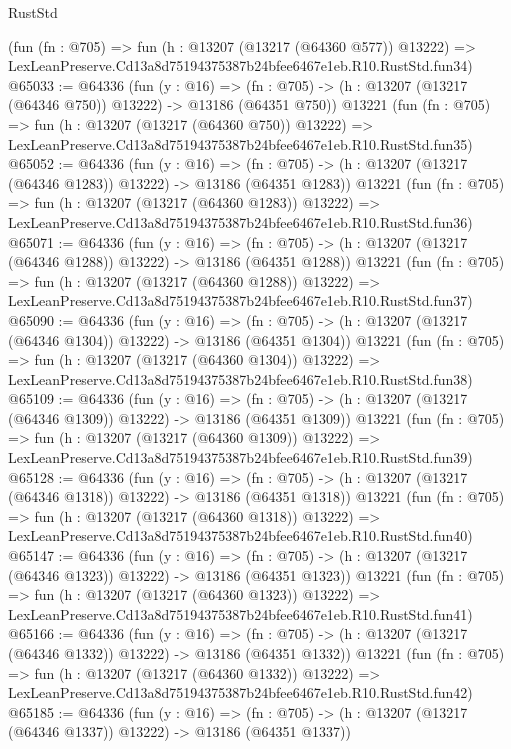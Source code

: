 \begin{lexlean}{RustStd}
\begin{coremodule}
    (fun (fn : @705) =>
    fun (h : @13207 (@13217 (@64360 @577)) @13222) =>
    LexLeanPreserve.Cd13a8d75194375387b24bfee6467e1eb.R10.RustStd.fun34)
@65033 := @64336
    (fun (y : @16) =>
    (fn : @705) -> (h : @13207 (@13217 (@64346 @750)) @13222) -> @13186 (@64351 @750))
    @13221
    (fun (fn : @705) =>
    fun (h : @13207 (@13217 (@64360 @750)) @13222) =>
    LexLeanPreserve.Cd13a8d75194375387b24bfee6467e1eb.R10.RustStd.fun35)
@65052 := @64336
    (fun (y : @16) =>
    (fn : @705) -> (h : @13207 (@13217 (@64346 @1283)) @13222) -> @13186 (@64351 @1283))
    @13221
    (fun (fn : @705) =>
    fun (h : @13207 (@13217 (@64360 @1283)) @13222) =>
    LexLeanPreserve.Cd13a8d75194375387b24bfee6467e1eb.R10.RustStd.fun36)
@65071 := @64336
    (fun (y : @16) =>
    (fn : @705) -> (h : @13207 (@13217 (@64346 @1288)) @13222) -> @13186 (@64351 @1288))
    @13221
    (fun (fn : @705) =>
    fun (h : @13207 (@13217 (@64360 @1288)) @13222) =>
    LexLeanPreserve.Cd13a8d75194375387b24bfee6467e1eb.R10.RustStd.fun37)
@65090 := @64336
    (fun (y : @16) =>
    (fn : @705) -> (h : @13207 (@13217 (@64346 @1304)) @13222) -> @13186 (@64351 @1304))
    @13221
    (fun (fn : @705) =>
    fun (h : @13207 (@13217 (@64360 @1304)) @13222) =>
    LexLeanPreserve.Cd13a8d75194375387b24bfee6467e1eb.R10.RustStd.fun38)
@65109 := @64336
    (fun (y : @16) =>
    (fn : @705) -> (h : @13207 (@13217 (@64346 @1309)) @13222) -> @13186 (@64351 @1309))
    @13221
    (fun (fn : @705) =>
    fun (h : @13207 (@13217 (@64360 @1309)) @13222) =>
    LexLeanPreserve.Cd13a8d75194375387b24bfee6467e1eb.R10.RustStd.fun39)
@65128 := @64336
    (fun (y : @16) =>
    (fn : @705) -> (h : @13207 (@13217 (@64346 @1318)) @13222) -> @13186 (@64351 @1318))
    @13221
    (fun (fn : @705) =>
    fun (h : @13207 (@13217 (@64360 @1318)) @13222) =>
    LexLeanPreserve.Cd13a8d75194375387b24bfee6467e1eb.R10.RustStd.fun40)
@65147 := @64336
    (fun (y : @16) =>
    (fn : @705) -> (h : @13207 (@13217 (@64346 @1323)) @13222) -> @13186 (@64351 @1323))
    @13221
    (fun (fn : @705) =>
    fun (h : @13207 (@13217 (@64360 @1323)) @13222) =>
    LexLeanPreserve.Cd13a8d75194375387b24bfee6467e1eb.R10.RustStd.fun41)
@65166 := @64336
    (fun (y : @16) =>
    (fn : @705) -> (h : @13207 (@13217 (@64346 @1332)) @13222) -> @13186 (@64351 @1332))
    @13221
    (fun (fn : @705) =>
    fun (h : @13207 (@13217 (@64360 @1332)) @13222) =>
    LexLeanPreserve.Cd13a8d75194375387b24bfee6467e1eb.R10.RustStd.fun42)
@65185 := @64336
    (fun (y : @16) =>
    (fn : @705) -> (h : @13207 (@13217 (@64346 @1337)) @13222) -> @13186 (@64351 @1337))

\end{coremodule}
\end{lexlean}
